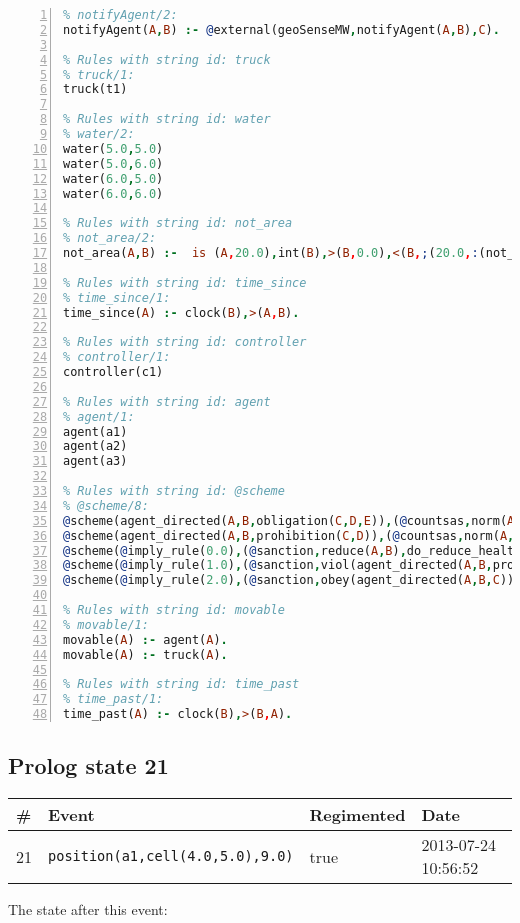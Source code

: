 \documentclass[11pt]{article}\usepackage[utf8]{inputenc}\usepackage{geometry}
\begin{document}
\begin{lstlisting}[language=Prolog, numbers=left]
% Rules with string id: notifyAgent
% notifyAgent/2:
notifyAgent(A,B) :- @external(geoSenseMW,notifyAgent(A,B),C).

% Rules with string id: truck
% truck/1:
truck(t1)

% Rules with string id: water
% water/2:
water(5.0,5.0)
water(5.0,6.0)
water(6.0,5.0)
water(6.0,6.0)

% Rules with string id: not_area
% not_area/2:
not_area(A,B) :-  is (A,20.0),int(B),>(B,0.0),<(B,;(20.0,:(not_area(A,B), is (-(B),20.0)))),int(A),>(A,0.0),<(A,;(20.0,:(area(A,B),-(int(A))))),int(B),>(A,0.0),>(B,0.0),<(A,21.0),<(B,21.0).

% Rules with string id: time_since
% time_since/1:
time_since(A) :- clock(B),>(A,B).

% Rules with string id: controller
% controller/1:
controller(c1)

% Rules with string id: agent
% agent/1:
agent(a1)
agent(a2)
agent(a3)

% Rules with string id: @scheme
% @scheme/8:
@scheme(agent_directed(A,B,obligation(C,D,E)),(@countsas,norm(A,B,F,obligation(C,D,E)),F),false,(listTrue(C)),(time_past(D)),false,[plus(viol(agent_directed(A,B,obligation(C,D,E))))|[]],[plus(obey(agent_directed(A,B,obligation(C,D,E))))|[]])
@scheme(agent_directed(A,B,prohibition(C,D)),(@countsas,norm(A,B,E,prohibition(C,D)),E),(listTrue(C)),false,(false),false,[plus(viol(agent_directed(A,B,prohibition(C,D))))|[]],[plus(obey(agent_directed(A,B,prohibition(C,D))))|[]])
@scheme(@imply_rule(0.0),(@sanction,reduce(A,B),do_reduce_health(A,B),notifyAgent(A,changed(status))),true,false,false,false,[min(reduce(A,B))|[]],[])
@scheme(@imply_rule(1.0),(@sanction,viol(agent_directed(A,B,prohibition(C,D))),do_sanction(D)),true,false,false,false,[min(viol(agent_directed(A,B,prohibition(C,D))))|[]],[])
@scheme(@imply_rule(2.0),(@sanction,obey(agent_directed(A,B,C))),true,false,false,false,[min(obey(agent_directed(A,B,C)))|[]],[])

% Rules with string id: movable
% movable/1:
movable(A) :- agent(A).
movable(A) :- truck(A).

% Rules with string id: time_past
% time_past/1:
time_past(A) :- clock(B),>(B,A).

\end{lstlisting}
\clearpage 
\subsection{Prolog state 21}
\begin{table}[ht]
\centering 
\begin{tabular}{l l l l} 
\textbf{\#} & \textbf{Event} & \textbf{Regimented} & \textbf{Date} \\ [0.5ex] 
\hline
21&\texttt{position(a1,cell(4.0,5.0),9.0)}&true&2013-07-24 10:56:52\\ [1ex] \hline\end{tabular}
\end{table}
The state after this event:
\end{document}
